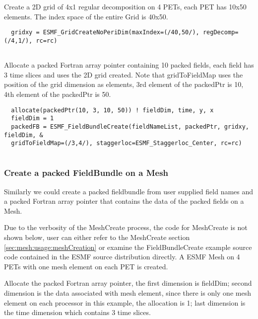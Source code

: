    Create a 2D grid of 4x1 regular decomposition on 4 PETs, each PET has 10x50 elements.
   The index space of the entire Grid is 40x50. 

 \begin{verbatim}
  gridxy = ESMF_GridCreateNoPeriDim(maxIndex=(/40,50/), regDecomp=(/4,1/), rc=rc)
 
\end{verbatim}
 

   Allocate a packed Fortran array pointer containing 10 packed fields, each field has
   3 time slices and uses the 2D grid created. Note that gridToFieldMap uses the position
   of the grid dimension as elements, 3rd element of the packedPtr is 10, 4th element
   of the packedPtr is 50. 

 \begin{verbatim}
  allocate(packedPtr(10, 3, 10, 50)) ! fieldDim, time, y, x
  fieldDim = 1
  packedFB = ESMF_FieldBundleCreate(fieldNameList, packedPtr, gridxy, fieldDim, &
  gridToFieldMap=(/3,4/), staggerloc=ESMF_Staggerloc_Center, rc=rc)
 
\end{verbatim}
 

   \subsubsection{Create a packed FieldBundle on a Mesh}
   \label{sec:fieldbundle:usage:packedFBMesh}
   Similarly we could create a packed fieldbundle from user supplied 
   field names and a packed Fortran array pointer that contains
   the data of the packed fields on a Mesh. 
   
   Due to the verbosity of the MeshCreate process, the code for MeshCreate is
   not shown below, user can either refer to the MeshCreate section
   \ref{sec:mesh:usage:meshCreation}
   or examine the FieldBundleCreate example source code contained
   in the ESMF source distribution directly.
   A ESMF Mesh on 4 PETs with one mesh element on each PET is created. 

   Allocate the packed Fortran array pointer, the first dimension
   is fieldDim; second dimension is the data associated with mesh element,
   since there is only one mesh element on each processor in this example,
   the allocation is 1; last dimension is the time dimension which contains
   3 time slices. 

